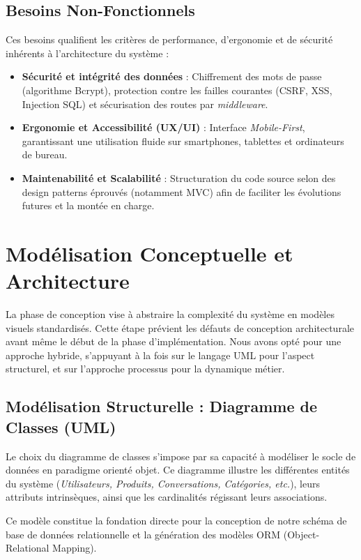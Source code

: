 \subsection{Besoins Non-Fonctionnels}
Ces besoins qualifient les critères de performance, d'ergonomie et de sécurité inhérents à l'architecture du système :
\begin{itemize}
    \item \textbf{Sécurité et intégrité des données} : Chiffrement des mots de passe (algorithme Bcrypt), protection contre les failles courantes (CSRF, XSS, Injection SQL) et sécurisation des routes par \textit{middleware}.
    \item \textbf{Ergonomie et Accessibilité (UX/UI)} : Interface \textit{Mobile-First}, garantissant une utilisation fluide sur smartphones, tablettes et ordinateurs de bureau.
    \item \textbf{Maintenabilité et Scalabilité} : Structuration du code source selon des design patterns éprouvés (notamment MVC) afin de faciliter les évolutions futures et la montée en charge.
\end{itemize}

\section{Modélisation Conceptuelle et Architecture}
La phase de conception vise à abstraire la complexité du système en modèles visuels standardisés. Cette étape prévient les défauts de conception architecturale avant même le début de la phase d'implémentation. Nous avons opté pour une approche hybride, s'appuyant à la fois sur le langage UML pour l'aspect structurel, et sur l'approche processus pour la dynamique métier.

\subsection{Modélisation Structurelle : Diagramme de Classes (UML)}
Le choix du diagramme de classes s'impose par sa capacité à modéliser le socle de données en paradigme orienté objet. Ce diagramme illustre les différentes entités du système (\textit{Utilisateurs, Produits, Conversations, Catégories, etc.}), leurs attributs intrinsèques, ainsi que les cardinalités régissant leurs associations. 

Ce modèle constitue la fondation directe pour la conception de notre schéma de base de données relationnelle et la génération des modèles ORM (Object-Relational Mapping).

